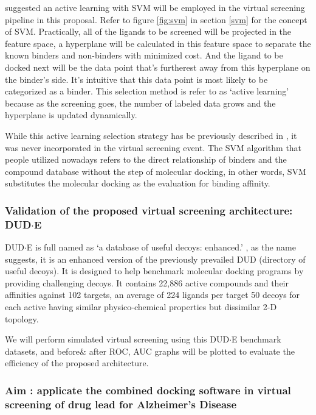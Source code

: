 \citet{warmuth2003active} suggested an active learning with SVM will be employed in the virtual screening pipeline in this proposal. 
Refer to figure \ref{fig:svm} in section \ref{svm} for the concept of SVM.
Practically, all of the ligands to be screened will be projected in the feature space, 
a hyperplane will be calculated in this feature space to separate the known binders and non-binders with minimized cost.
And the ligand to be docked next will be the data point that's furtherest away from this hyperplane on the binder's side. It's intuitive that this data point is most likely to be categorized as a binder. 
This selection method is refer to as `active learning' because as the screening goes, the number of labeled data grows and the hyperplane is updated dynamically.

While this active learning selection strategy has be previously described in \citet{warmuth2003active}, it was never incorporated in the virtual screening event. 
The SVM algorithm that people utilized nowadays refers to the direct relationship of binders and the compound database without the step of molecular docking, in other words, SVM substitutes the molecular docking as the evaluation for binding affinity.


\subsubsection{Validation of the proposed virtual screening architecture: DUD$\cdot$E}

DUD$\cdot$E is full named as `a database of useful decoys: enhanced.' \cite{mysinger2012directory}, as the name suggests, it is an enhanced version of the previously prevailed DUD (directory of useful decoys).
It is designed to help benchmark molecular docking programs by providing challenging decoys.
It contains 22,886 active compounds and their affinities against 102 targets, an average of 224 ligands per target 50 decoys for each active having similar physico-chemical properties but dissimilar 2-D topology.

We will perform simulated virtual screening using this DUD$\cdot$E benchmark datasets, and before\& after ROC, AUC graphs will be plotted to evaluate the efficiency of the proposed architecture.


\subsubsection{Aim : applicate the combined docking software in virtual screening of drug lead for Alzheimer’s Disease}


